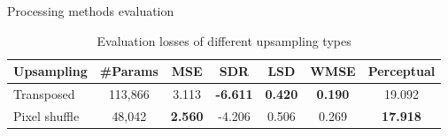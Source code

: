 \documentclass{beamer}
\begin{document}
\begin{frame}{Processing methods evaluation}
    \begin{table}
        \centering
        \hspace{-1.0cm}
        \small
        \caption{Evaluation losses of different upsampling types}
        \label{Evaluation losses of the upsampling types comparison}
        \vspace{-0.25cm}
        \begin{tabular}{l|c|c|c|c|c|c}
            \hline
            Upsampling & \#Params & MSE & SDR & LSD & WMSE & Perceptual \\
            \hline
            Transposed & 113,866 & 3.113 & \textbf{-6.611} & \textbf{0.420} & \textbf{0.190} & 19.092 \\
            \hline
            Pixel shuffle & 48,042 & \textbf{2.560} & -4.206 & 0.506 & 0.269 & \textbf{17.918} \\
            \hline
        \end{tabular}
    \end{table}

\end{frame}



\end{document}
